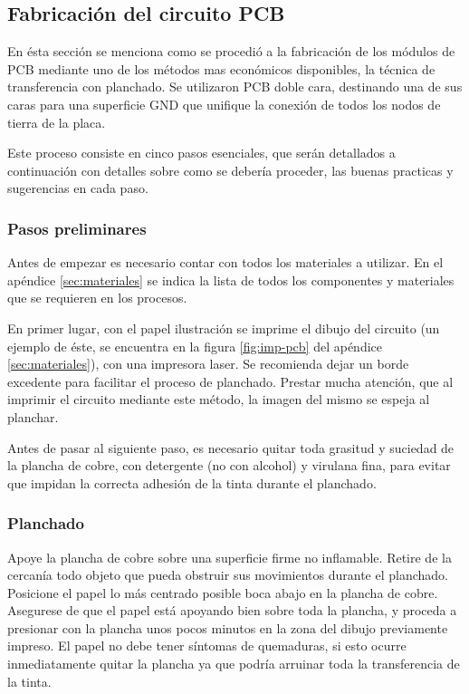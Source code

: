 


\subsection{Fabricación del circuito PCB}
En ésta sección se menciona como se procedió a la fabricación de los módulos de PCB mediante uno de los métodos mas económicos disponibles, la técnica de transferencia con planchado. Se utilizaron PCB doble cara, destinando una de sus caras para una superficie GND que unifique la conexión de todos los nodos de tierra de la placa.

Este proceso consiste en cinco pasos esenciales, que serán detallados a continuación con detalles sobre como se debería proceder, las buenas practicas y sugerencias en cada paso.

\subsubsection{Pasos preliminares}
Antes de empezar es necesario contar con todos los materiales a utilizar. En el apéndice \ref{sec:materiales} se indica la lista de todos los componentes y materiales que se requieren en los procesos.

En primer lugar, con el papel ilustración se imprime el dibujo del circuito (un ejemplo de éste, se encuentra en la figura \ref{fig:imp-pcb} del apéndice \ref{sec:materiales}), con una impresora laser. Se recomienda dejar un borde excedente para facilitar el proceso de planchado. Prestar mucha atención, que al imprimir el circuito mediante este método, la imagen del mismo se espeja al planchar.

Antes de pasar al siguiente paso, es necesario quitar toda grasitud y suciedad de la plancha de cobre, con detergente (no con alcohol) y virulana fina, para evitar que impidan la correcta adhesión de la tinta durante el planchado.

\subsubsection{Planchado}
Apoye la plancha de cobre sobre una superficie firme no inflamable. Retire de la cercanía todo objeto que pueda obstruir sus movimientos durante el planchado. Posicione el papel lo más centrado posible boca abajo en la plancha de cobre. Asegurese de que el papel está apoyando bien sobre toda la plancha, y proceda a presionar con la plancha unos pocos minutos en la zona del dibujo previamente impreso. El papel no debe tener síntomas de quemaduras, si esto ocurre inmediatamente quitar la plancha ya que podría arruinar toda la transferencia de la tinta.


